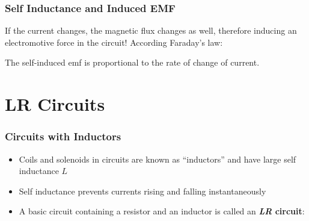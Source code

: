 \documentclass[12pt,aspectratio=169]{beamer}
\newcommand{\eq}[2]{\vspace{#1}{\Large\begin{displaymath}#2\end{displaymath}}}
\begin{document}
\begin{frame}
  \frametitle{Self Inductance and Induced EMF}
  If the current changes, the magnetic flux changes as well, therefore inducing
  an electromotive force in the circuit! According Faraday's law:

  \eq{-.2in}{
    \boxed{\mathcal{E}=-\frac{d\Phi}{dt}=-L\frac{dI}{dt}}
  }

  The self-induced emf is proportional to the rate of change of current.
\end{frame}


%



\section{LR Circuits}

\begin{frame}
  \frametitle{Circuits with Inductors}
  \begin{itemize}
  \item Coils and solenoids in circuits are known as ``inductors'' and have
    large self inductance $L$
  \item Self inductance prevents currents rising and falling instantaneously
  \item A basic circuit containing a resistor and an inductor is called an
    \textbf{\emph{LR} circuit}:
    \begin{center}
    \end{center}
  \end{itemize}
\end{frame}
\end{document}
